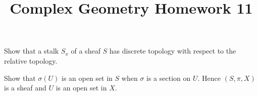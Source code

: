 \documentclass[12pt]{article}
\title{Complex Geometry Homework 11}
\author{}
\date{}
\begin{document}
\maketitle
\begin{problem}
  Show that a stalk \(S_x\) of a sheaf \(S\) has discrete topology with respect to
  the relative topology.
\end{problem}
\begin{problem}
  Show that \(\sigma(U)\) is an open set in \(S\) when \(\sigma\) is a section on
  \(U\). Hence \((S,\pi,X)\) is a sheaf and \(U\) is an open set in \(X\).
\end{problem}
\end{document}
